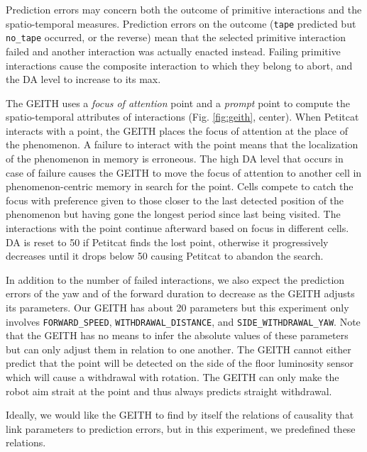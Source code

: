 \documentclass[runningheads]{llncs}
\begin{document}
Prediction errors may concern both the outcome of primitive interactions and the spatio-temporal measures.
Prediction errors on the outcome (\texttt{tape} predicted but \texttt{no\_tape} occurred, or the reverse) mean that the selected primitive interaction failed and another interaction was actually enacted instead. 
Failing primitive interactions cause the composite interaction to which they belong to abort, and the DA level to increase to its max.

The GEITH uses a \textit{focus of attention} point and a \textit{prompt} point to compute the spatio-temporal attributes of interactions (Fig. \ref{fig:geith}, center). 
When Petitcat interacts with a point, the GEITH places the focus of attention at the place of the phenomenon. 
A failure to interact with the point means that the localization of the phenomenon in memory is erroneous. 
The high DA level that occurs in case of failure causes the GEITH to move the focus of attention to another cell in phenomenon-centric memory in search for the point.
Cells compete to catch the focus with preference given to those closer to the last detected position of the phenomenon but having gone the longest period since last being visited.
The interactions with the point continue afterward based on focus in different cells. 
DA is reset to 50 if Petitcat finds the lost point, otherwise it progressively decreases until it drops below 50 causing Petitcat to abandon the search. 

In addition to the number of failed interactions, we also expect the prediction errors of the yaw and of the forward duration to decrease as the GEITH adjusts its parameters. 
Our GEITH has about 20 parameters but this experiment only involves \texttt{FORWARD\_SPEED}, \texttt{WITHDRAWAL\_DIS\-TANCE}, and \texttt{SIDE\_WITH\-DRA\-WAL\_YAW}.
Note that the GEITH has no means to infer the absolute values of these parameters but can only adjust them in relation to one another.
The GEITH cannot either predict that the point will be detected on the side of the floor luminosity sensor which will cause a withdrawal with rotation. The GEITH can only make the robot aim strait at the point and thus always predicts straight withdrawal. 

Ideally, we would like the GEITH to find by itself the relations of causality that link parameters to prediction errors, but in this experiment, we predefined these relations.
\end{document}
